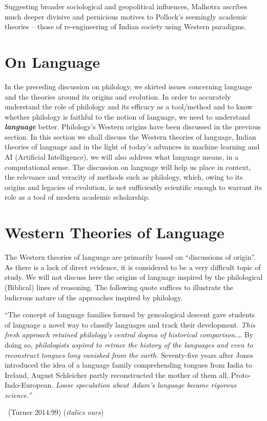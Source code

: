 Suggesting broader sociological and geopolitical influences, Malhotra ascribes much deeper divisive and pernicious motives to Pollock’s seemingly academic theories – those of re-engineering of Indian society using Western paradigms.


\section*{On Language}

\vskip -6pt

In the preceding discussion on philology, we skirted issues concerning language and the theories around its origins and evolution. In order to accurately understand the role of philology and its efficacy as a tool/method and to know whether philology is faithful to the notion of language, we need to understand \textbf{\textit{language}} better. Philology’s Western origins have been discussed in the previous section. In this section we shall discuss the Western theories of language, Indian theories of language and in the light of today’s advances in machine learning and AI (Artificial Intelligence), we will also address what language means, in a computational sense. The discussion on language will help us place in context, the relevance and veracity of methods such as philology, which, owing to its origins and legacies of evolution, is not sufficiently scientific enough to warrant its role as a tool of modern academic scholarship.


\section*{Western Theories of Language}

\vskip -6pt

The Western theories of language are primarily based on “discussions of origin”. As there is a lack of direct evidence, it is considered to be a very difficult topic of study. We will not discuss here the origins of language inspired by the philological (Biblical) lines of reasoning. The following quote suffices to illustrate the ludicrous nature of the approaches inspired by philology.

\begin{myquote}
“The concept of language families formed by genealogical descent gave students of language a novel way to classify languages and track their development. \textit{This fresh approach retained philology’s central dogma of historical comparison.…} By doing so, \textit{philologists aspired to retrace the history of the languages and even to reconstruct tongues long vanished from the earth.} Seventy-five years after Jones introduced the idea of a language family comprehending tongues from India to Ireland, August Schleicher partly reconstructed the mother of them all, Proto-Indo-European. \textit{Loose speculation about Adam’s language became rigorous science.”}

~\hfill (Turner 2014:99) (\textit{italics ours})
\end{myquote}


